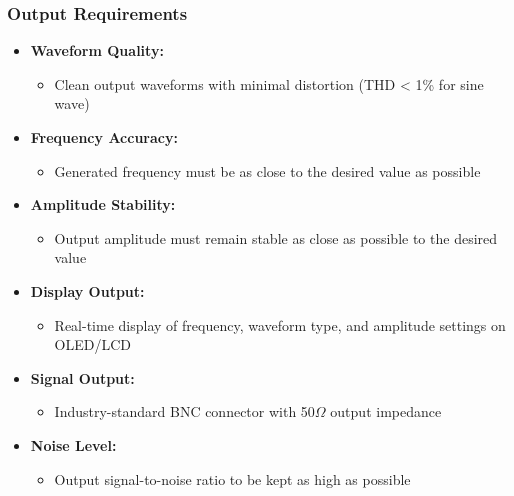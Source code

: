 \documentclass[a4paper,12pt]{article}
\begin{document}
\subsubsection{Output Requirements}
\begin{itemize}
    \item \textbf{Waveform Quality:}
    \begin{itemize}
        \item Clean output waveforms with minimal distortion (THD < 1\% for sine wave)
    \end{itemize}
    \item \textbf{Frequency Accuracy: }
    \begin{itemize}
        \item Generated frequency must be as close to the desired value as possible
    \end{itemize}
    \item \textbf{Amplitude Stability:}
    \begin{itemize}
        \item Output amplitude must remain stable as close as possible to the desired value
    \end{itemize}
    \item \textbf{Display Output:}
    \begin{itemize}
        \item Real-time display of frequency, waveform type, and amplitude settings on OLED/LCD
    \end{itemize}
    \item \textbf{Signal Output:}
    \begin{itemize}
        \item Industry-standard BNC connector with 50\(\Omega\) output impedance
    \end{itemize}
    \item \textbf{Noise Level:}
    \begin{itemize}
        \item Output signal-to-noise ratio to be kept as high as possible
    \end{itemize}
\end{itemize}
\end{document}
